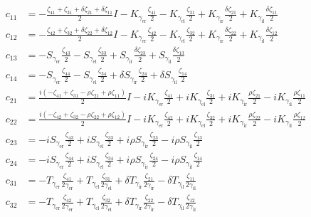 \begin{align*}
  c_{11} &= -\frac{\zeta_{41}+\zeta_{31}+\delta \zeta_{21}+\delta \zeta_{11}}{2} I-K_{\gamma_\text{er}} \frac{\zeta_{41}}{2}-K_{\gamma_\text{el}} \frac{\zeta_{31}}{2}+K_{\gamma_\text{ir}} \frac{\delta\zeta_{21}}{2}+K_{\gamma_\text{il}} \frac{\delta\zeta_{11}}{2} \\
  c_{12} &= -\frac{\zeta_{42}+\zeta_{32}+\delta \zeta_{22}+\delta \zeta_{12}}{2} I-K_{\gamma_\text{er}} \frac{\zeta_{42}}{2}-K_{\gamma_\text{el}} \frac{\zeta_{32}}{2}+K_{\gamma_\text{ir}} \frac{\delta\zeta_{22}}{2}+K_{\gamma_\text{il}} \frac{\delta \zeta_{12}}{2} \\
  c_{13} &= -S_{\gamma_\text{er}} \frac{\zeta_{43}}{2}-S_{\gamma_\text{el}} \frac{\zeta_{33}}{2}+S_{\gamma_\text{ir}} \frac{\delta \zeta_{23}}{2}+S_{\gamma_\text{il}} \frac{\delta \zeta_{13}}{2} \\
  c_{14} &= -S_{\gamma_\text{er}} \frac{\zeta_{44}}{2}-S_{\gamma_\text{el}} \frac{\zeta_{34}}{2}+\delta S_{\gamma_\text{ir}} \frac{\zeta_{24}}{2}+\delta S_{\gamma_\text{il}} \frac{\zeta_{14}}{2} \\
  c_{21} &= \frac{i(-\zeta_{41}+\zeta_{31}-\rho \zeta_{21}+\rho \zeta_{11})}{2} I-i K_{\gamma_\text{er}} \frac{\zeta_{41}}{2}+i K_{\gamma_\text{el}} \frac{\zeta_{31}}{2}+i K_{\gamma_\text{ir}} \frac{\rho \zeta_{21}}{2}-i K_{\gamma_\text{il}} \frac{\rho \zeta_{11}}{2} \\
  c_{22} &= \frac{i(-\zeta_{42}+\zeta_{32}-\rho \zeta_{22}+\rho \zeta_{12})}{2} I-i K_{\gamma_\text{er}} \frac{\zeta_{42}}{2}+i K_{\gamma_\text{el}} \frac{\zeta_{32}}{2}+i K_{\gamma_\text{ir}} \frac{\rho \zeta_{22}}{2}-i K_{\gamma_\text{il}} \frac{\rho \zeta_{12}}{2} \\
  c_{23} &= -i S_{\gamma_\text{er}} \frac{\zeta_{43}}{2}+i S_{\gamma_\text{el}} \frac{\zeta_{33}}{2}+i \rho S_{\gamma_\text{ir}} \frac{\zeta_{23}}{2}-i \rho S_{\gamma_\text{il}} \frac{\zeta_{13}}{2} \\
  c_{24} &= -i S_{\gamma_\text{er}} \frac{\zeta_{44}}{2}+i S_{\gamma_\text{el}} \frac{\zeta_{34}}{2}+i \rho S_{\gamma_\text{ir}} \frac{\zeta_{24}}{2}-i \rho S_{\gamma_\text{il}} \frac{\zeta_{14}}{2} \\
  c_{31} &= -T_{\gamma_\text{er}} \frac{\zeta_{41}}{2 \gamma_\text{er}}+T_{\gamma_\text{el}} \frac{\zeta_{31}}{2 \gamma_\text{el}}+\delta T_{\gamma_\text{ir}} \frac{\zeta_{21}}{2 \gamma_\text{ir}}-\delta T_{\gamma_\text{il}} \frac{\zeta_{11}}{2 \gamma_\text{il}} \\
  c_{32} &= -T_{\gamma_\text{er}} \frac{\zeta_{42}}{2 \gamma_\text{er}}+T_{\gamma_\text{el}} \frac{\zeta_{32}}{2 \gamma_\text{el}}+\delta T_{\gamma_\text{ir}} \frac{\zeta_{22}}{2 \gamma_\text{ir}}-\delta T_{\gamma_\text{il}} \frac{\zeta_{12}}{2 \gamma_\text{il}} \\
\end{align*}
